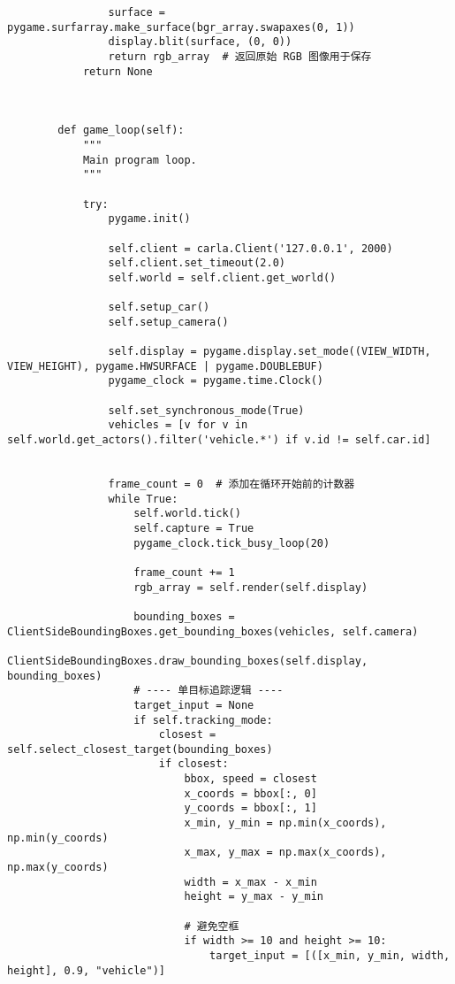 \begin{lstlisting}
	            surface = pygame.surfarray.make_surface(bgr_array.swapaxes(0, 1))
	            display.blit(surface, (0, 0))
	            return rgb_array  # 返回原始 RGB 图像用于保存
	        return None
	
	
	
	    def game_loop(self):
	        """
	        Main program loop.
	        """
	
	        try:
	            pygame.init()
	
	            self.client = carla.Client('127.0.0.1', 2000)
	            self.client.set_timeout(2.0)
	            self.world = self.client.get_world()
	
	            self.setup_car()
	            self.setup_camera()
	
	            self.display = pygame.display.set_mode((VIEW_WIDTH, VIEW_HEIGHT), pygame.HWSURFACE | pygame.DOUBLEBUF)
	            pygame_clock = pygame.time.Clock()
	
	            self.set_synchronous_mode(True)
	            vehicles = [v for v in self.world.get_actors().filter('vehicle.*') if v.id != self.car.id]
	
	
	            frame_count = 0  # 添加在循环开始前的计数器
	            while True:
	                self.world.tick()
	                self.capture = True
	                pygame_clock.tick_busy_loop(20)
	
	                frame_count += 1
	                rgb_array = self.render(self.display)
	
	                bounding_boxes = ClientSideBoundingBoxes.get_bounding_boxes(vehicles, self.camera)
	                ClientSideBoundingBoxes.draw_bounding_boxes(self.display, bounding_boxes)
	                # ---- 单目标追踪逻辑 ----
	                target_input = None
	                if self.tracking_mode:
	                    closest = self.select_closest_target(bounding_boxes)
	                    if closest:
	                        bbox, speed = closest
	                        x_coords = bbox[:, 0]
	                        y_coords = bbox[:, 1]
	                        x_min, y_min = np.min(x_coords), np.min(y_coords)
	                        x_max, y_max = np.max(x_coords), np.max(y_coords)
	                        width = x_max - x_min
	                        height = y_max - y_min
	
	                        # 避免空框
	                        if width >= 10 and height >= 10:
	                            target_input = [([x_min, y_min, width, height], 0.9, "vehicle")]
	

\end{lstlisting}

